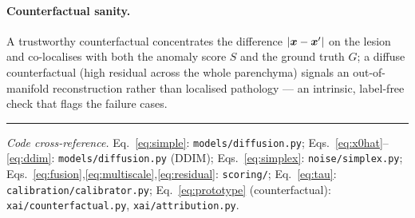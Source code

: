 \paragraph{Counterfactual sanity.} A trustworthy counterfactual concentrates the
difference $|\bm{x}-\bm{x}'|$ on the lesion and co-localises with both the anomaly score
$S$ and the ground truth $G$; a diffuse counterfactual (high residual across the
whole parenchyma) signals an out-of-manifold reconstruction rather than localised
pathology --- an intrinsic, label-free check that flags the failure cases.

\bigskip
\hrule
\bigskip
\noindent\textit{Code cross-reference.} Eq.~\eqref{eq:simple}: \texttt{models/diffusion.py};
Eqs.~\eqref{eq:x0hat}--\eqref{eq:ddim}: \texttt{models/diffusion.py} (DDIM);
Eqs.~\eqref{eq:simplex}: \texttt{noise/simplex.py};
Eqs.~\eqref{eq:fusion},\eqref{eq:multiscale},\eqref{eq:residual}: \texttt{scoring/};
Eq.~\eqref{eq:tau}: \texttt{calibration/calibrator.py};
Eq.~\eqref{eq:prototype} (counterfactual): \texttt{xai/counterfactual.py},
\texttt{xai/attribution.py}.

